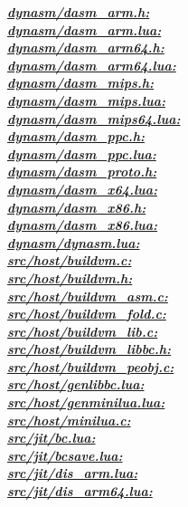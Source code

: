 \underline{\textbf{\emph{dynasm/dasm\_arm.h:}}}\\
\underline{\textbf{\emph{dynasm/dasm\_arm.lua:}}}\\
\underline{\textbf{\emph{dynasm/dasm\_arm64.h:}}}\\
\underline{\textbf{\emph{dynasm/dasm\_arm64.lua:}}}\\
\underline{\textbf{\emph{dynasm/dasm\_mips.h:}}}\\
\underline{\textbf{\emph{dynasm/dasm\_mips.lua:}}}\\
\underline{\textbf{\emph{dynasm/dasm\_mips64.lua:}}}\\
\underline{\textbf{\emph{dynasm/dasm\_ppc.h:}}}\\
\underline{\textbf{\emph{dynasm/dasm\_ppc.lua:}}}\\
\underline{\textbf{\emph{dynasm/dasm\_proto.h:}}}\\
\underline{\textbf{\emph{dynasm/dasm\_x64.lua:}}}\\
\underline{\textbf{\emph{dynasm/dasm\_x86.h:}}}\\
\underline{\textbf{\emph{dynasm/dasm\_x86.lua:}}}\\
\underline{\textbf{\emph{dynasm/dynasm.lua:}}}\\
\underline{\textbf{\emph{src/host/buildvm.c:}}}\\
\underline{\textbf{\emph{src/host/buildvm.h:}}}\\
\underline{\textbf{\emph{src/host/buildvm\_asm.c:}}}\\
\underline{\textbf{\emph{src/host/buildvm\_fold.c:}}}\\
\underline{\textbf{\emph{src/host/buildvm\_lib.c:}}}\\
\underline{\textbf{\emph{src/host/buildvm\_libbc.h:}}}\\
\underline{\textbf{\emph{src/host/buildvm\_peobj.c:}}}\\
\underline{\textbf{\emph{src/host/genlibbc.lua:}}}\\
\underline{\textbf{\emph{src/host/genminilua.lua:}}}\\
\underline{\textbf{\emph{src/host/minilua.c:}}}\\
\underline{\textbf{\emph{src/jit/bc.lua:}}}\\
\underline{\textbf{\emph{src/jit/bcsave.lua:}}}\\
\underline{\textbf{\emph{src/jit/dis\_arm.lua:}}}\\
\underline{\textbf{\emph{src/jit/dis\_arm64.lua:}}}\\
